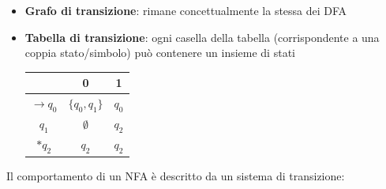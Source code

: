 \documentclass[12pt, a4paper]{report}
\begin{document}
                \begin{itemize}
                    \item \textbf{Grafo di transizione}: rimane concettualmente la stessa dei DFA
                    \item \textbf{Tabella di transizione}: ogni casella della tabella (corrispondente a una coppia stato/simbolo) può contenere un insieme di stati \begin{center}
                        \begin{tabular}{|c|c|c|}
                            \hline
                             & 0 & 1\\
                             \hline
                             $\to q_0$ & $\{q_0,q_1\}$ & $q_0$\\
                             \hline
                             $q_1$ & $\emptyset$ & $q_2$\\
                             \hline
                             $*q_2$ & $q_2$ & $q_2$\\
                            \hline
                        \end{tabular}
                    \end{center}
                \end{itemize}
                Il comportamento di un NFA è descritto da un sistema di transizione:
\end{document}
